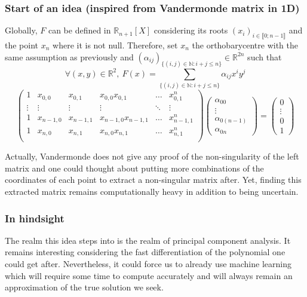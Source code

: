 \subsubsection*{Start of an idea (inspired from Vandermonde matrix in 1D)}
Globally, $F$ can be defined in $\mathbb{R}_{n+1}[X]$ considering its roots $(x_i)_{i\in \llbracket0;n-1\rrbracket }$ and the point $x_n$ where it is not null. Therefore, set $x_n$ the orthobarycentre with the same assumption as previously 	and $(\alpha_{ij})_{\{(i,j)\in\mathbb{N}:i+j\leq n\}}\in\mathbb{R}^{2n}$ such that
\begin{equation*}
    \forall (x,y) \in \mathbb{R}^2,~F(x) = \sum_{\{(i,j)\in\mathbb{N}:i+j\leq n\}} \alpha_{ij}x^iy^j
\end{equation*}
\begin{equation*}
    \begin{pmatrix}
        1 & x_{0,0} & x_{0,1} & x_{0,0}x_{0,1} & \dots & x_{0,1}^{n} \\
        \vdots & \vdots&\vdots & \vdots& \ddots & \vdots \\
        1 & x_{n-1,0} & x_{n-1,1} & x_{n-1,0}x_{n-1,1} & \dots &x_{n-1,1}^{n} \\
        1 & x_{n,0} & x_{n,1} & x_{n,0}x_{n,1} & \dots & x_{n,1}^{n} \\
    \end{pmatrix}
    \begin{pmatrix}
        \alpha_{00}\\
        \vdots\\
        \alpha_{0(n-1)}\\
        \alpha_{0n}
    \end{pmatrix}
    =
    \begin{pmatrix}
        0\\
        \vdots\\
        0\\
        1
    \end{pmatrix}
\end{equation*}

Actually, Vandermonde does not give any proof of the non-singularity of the left matrix and one could thought about putting more combinations of the coordinates of each point to extract a non-singular matrix after.
Yet, finding this extracted matrix remains computationally heavy in addition to being uncertain.\\

\subsubsection*{In hindsight}
The realm this idea steps into is the realm of principal component analysis. It remains interesting considering the fast differentiation of the polynomial one could get after. Nevertheless, it could force us to already use machine learning which will require some time to compute accurately and will always remain an approximation of the true solution we seek.




